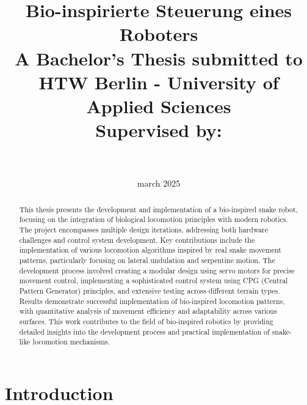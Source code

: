 \documentclass[12pt,a4paper]{report}
\title{
    \textbf{Bio-inspirierte Steuerung eines Roboters}\\ 
    \large A Bachelor's Thesis submitted to\\
    \large HTW Berlin - University of Applied Sciences\\[2cm]
    \large Supervised by:\\[0.3cm]
    \supervisor{Prof. Dr. Jochen Kerdels}{Fachbereich 1\break Computer Engineering }\\[0.5cm]
    \supervisor{Amr Eslim}
}
\date{march 2025}
\begin{document}
\maketitle

\begin{abstract}
This thesis presents the development and implementation of a bio-inspired snake robot, focusing on the integration of biological locomotion principles with modern robotics. The project encompasses multiple design iterations, addressing both hardware challenges and control system development. Key contributions include the implementation of various locomotion algorithms inspired by real snake movement patterns, particularly focusing on lateral undulation and serpentine motion. The development process involved creating a modular design using servo motors for precise movement control, implementing a sophisticated control system using CPG (Central Pattern Generator) principles, and extensive testing across different terrain types. Results demonstrate successful implementation of bio-inspired locomotion patterns, with quantitative analysis of movement efficiency and adaptability across various surfaces. This work contributes to the field of bio-inspired robotics by providing detailed insights into the development process and practical implementation of snake-like locomotion mechanisms.
\end{abstract}

\tableofcontents
\listoffigures
\listoftables
\chapter{Introduction}
\end{document}
